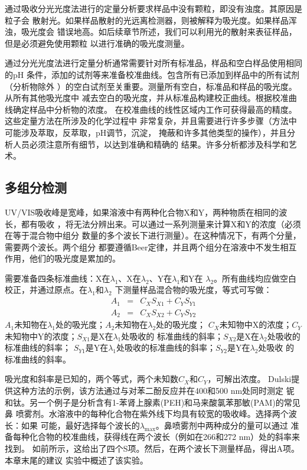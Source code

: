 通过吸收分光光度法进行的定量分析要求样品中没有颗粒，即没有浊度。其原因是粒子会
散射光。如果样品散射的光远离检测器，则被解释为吸光度。如果样品浑浊，吸光度会
错误地高。如后续章节所述，我们可以利用光的散射来表征样品，但是必须避免使用颗粒
以进行准确的吸光度测量。

通过分光光度法进行定量分析通常需要针对所有标准品，样品和空白样品使用相同的pH
条件，添加的试剂等来准备校准曲线。包含所有已添加到样品中的所有试剂（分析物除外
）的空白试剂至关重要。测量所有空白，标准品和样品的吸光度。从所有其他吸光度中
减去空白的吸光度，并从标准品构建校正曲线。根据校准曲线确定样品中分析物的浓度。
在校准曲线的线性区域内工作可获得最高的精度。这些定量方法在所涉及的化学过程中
非常复杂，并且需要进行许多步骤（方法中可能涉及萃取，反萃取，pH调节，沉淀，
掩蔽和许多其他类型的操作），并且分析人员必须注意所有细节，以达到准确和精确的
结果。许多分析都涉及科学和艺术。
\subsection{多组分检测}
UV/VIS吸收峰是宽峰，如果溶液中有两种化合物X和Y，两种物质在相同的波长，都有吸收
，将无法分辨出来。可以通过一系列测量来计算X和Y的浓度（必须在等于混合物中组分
数量的多个波长下进行测量）。在这种情况下，有两个分量，需要两个波长。两个组分
都要遵循Beer定律，并且两个组分在溶液中不发生相互作用，他们的吸光度是累加的。

需要准备四条标准曲线：X在$\lambda_1$、X在$\lambda_2$、Y在$\lambda_1$和Y在
$\lambda_2$。所有曲线均应做空白校正，并通过原点。在$\lambda_1$和$\lambda_2$
下测量样品混合物的吸光度，等式可写做：
\begin{equation}
    \begin{array}{rcl}
    A_1 &=& C_X S_{X1} + C_YS_{Y1}\\
    A_2 &=& C_X S_{X2} + C_YS_{Y2}
\end{array}
\label{5.3}
\end{equation}
$A_1$未知物在$\lambda_1$处的吸光度；$A_2$未知物在$\lambda_2$处的吸光度；
$C_X$未知物中X的浓度；$C_Y$未知物中Y的浓度；$S_{X1}$是X在$\lambda_1$处吸收的
标准曲线的斜率；$S_{X2}$是X在$\lambda_2$处吸收的标准曲线的斜率；
$S_{Y1}$是Y在$\lambda_1$处吸收的标准曲线的斜率；$S_{Y2}$是Y在$\lambda_2$处吸收
的标准曲线的斜率。

吸光度和斜率是已知的，两个等式，两个未知数$C_X$和$C_Y$，可解出浓度。
Dulski提供这种方法的示例，该方法通过与对苯二酚反应并在400和500 nm处同时测定
铌和钛。另一个例子是分析含有1-苯肾上腺素(PEH)和马来酸氯苯那敏(PAM)的常见鼻
喷雾剂。水溶液中的每种化合物在紫外线下均具有较宽的吸收峰。选择两个波长：如果
可能，最好选择每个波长的$\lambda_{\text{max}}$。鼻喷雾剂中两种成分的量可以通过
准备每种化合物的校准曲线，获得线在两个波长（例如在266和272 nm）处的斜率来找到。
如前所示，这给出了四个S项。然后，在两个波长下测量样品，得出A项。本章末尾的建议
实验中概述了该实验。


